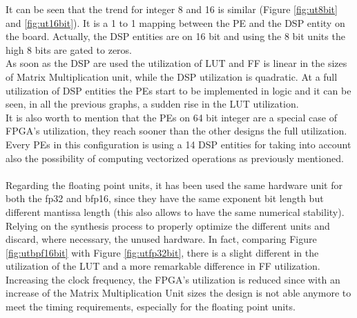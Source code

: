 It can be seen that the trend for integer 8 and 16 is similar (Figure \ref{fig:ut8bit} and \ref{fig:ut16bit}). It is a 1 to 1 mapping between the PE and the DSP entity on the board. Actually, the DSP entities are on 16 bit and using the 8 bit units the high 8 bits are gated to zeros.\\ 
As soon as the DSP are used the utilization of LUT and FF is linear in the sizes of Matrix Multiplication unit, while the DSP utilization is quadratic. At a full utilization of DSP entities the PEs start to be implemented in logic and it can be seen, in all the previous graphs, a sudden rise in the LUT utilization.\\It is also worth to mention that the PEs on 64 bit integer are a special case of FPGA's utilization, they reach sooner than the other designs the full utilization. Every PEs in this configuration is using a 14 DSP entities for taking into account also the possibility of computing vectorized operations as previously mentioned.\\\\
Regarding the floating point units, it has been used the same hardware unit for both the fp32 and bfp16, since they have the same exponent bit length but different mantissa length (this also allows to have the same numerical stability). Relying on the synthesis process to properly optimize the different units and discard, where necessary, the unused hardware. In fact, comparing Figure \ref{fig:utbpf16bit} with Figure \ref{fig:utfp32bit}, there is a slight different in the utilization of the LUT and a more remarkable difference in FF utilization.\\

Increasing the clock frequency, the FPGA's utilization is reduced since with an increase of the Matrix Multiplication Unit sizes the design is not able anymore to meet the timing requirements, especially for the floating point units. 
\newpage

